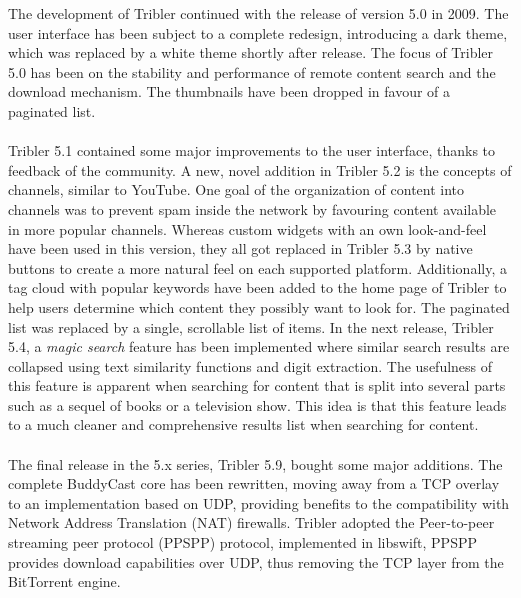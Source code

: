 \noindent The development of Tribler continued with the release of version 5.0 in 2009\cite{historyoftribler}. The user interface has been subject to a complete redesign, introducing a dark theme, which was replaced by a white theme shortly after release. The focus of Tribler 5.0 has been on the stability and performance of remote content search and the download mechanism. The thumbnails have been dropped in favour of a paginated list.\\\\
Tribler 5.1 contained some major improvements to the user interface, thanks to feedback of the community. A new, novel addition in Tribler 5.2 is the concepts of channels, similar to YouTube. One goal of the organization of content into channels was to prevent spam inside the network by favouring content available in more popular channels. Whereas custom widgets with an own look-and-feel have been used in this version, they all got replaced in Tribler 5.3 by native buttons to create a more natural feel on each supported platform. Additionally, a tag cloud with popular keywords have been added to the home page of Tribler to help users determine which content they possibly want to look for. The paginated list was replaced by a single, scrollable list of items. In the next release, Tribler 5.4, a \emph{magic search} feature has been implemented where similar search results are collapsed using text similarity functions and digit extraction. The usefulness of this feature is apparent when searching for content that is split into several parts such as a sequel of books or a television show. This idea is that this feature leads to a much cleaner and comprehensive results list when searching for content.\\\\
The final release in the 5.x series, Tribler 5.9, bought some major additions. The complete BuddyCast core has been rewritten, moving away from a TCP overlay to an implementation based on UDP, providing benefits to the compatibility with Network Address Translation (NAT) firewalls. Tribler adopted the Peer-to-peer streaming peer protocol (PPSPP) protocol\cite{bakker2015peer}, implemented in libswift\cite{libswiftgithub}, PPSPP provides download capabilities over UDP, thus removing the TCP layer from the BitTorrent engine.\\\\
